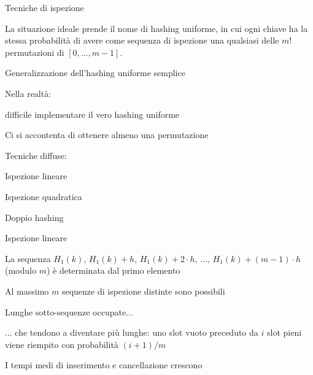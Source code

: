 \begin{frame}{Tecniche di ispezione}

\vspace{-9pt}
\begin{myboxtitle}
La situazione ideale prende il nome di \alert{hashing uniforme}, in cui
ogni chiave ha la stessa probabilità di avere come sequenza di ispezione
una qualsiasi delle $m!$ permutazioni di $[0, \ldots, m-1]$.
\end{myboxtitle}

\BIL
\item Generalizzazione dell'hashing uniforme semplice
\item Nella realtà:
\BI
\item \EE difficile implementare il vero hashing uniforme
\item Ci si accontenta di ottenere almeno una permutazione
\EI
\item Tecniche diffuse:
\BI
\item \alert{Ispezione lineare}
\item \alert{Ispezione quadratica}
\item \alert{Doppio hashing}
\EI
\EIL

\end{frame}

\begin{frame}{Ispezione lineare}
	
\vspace{-9pt}

\BIL
\item La sequenza $H_1(k)$, $H_1(k)+h$, $H_1(k)+2 \cdot h$, $\ldots$, $H_1(k)+(m-1) \cdot h$ 
(modulo $m$) è determinata dal primo elemento
\item Al massimo $m$ sequenze di ispezione distinte sono possibili
\EIL

\begin{myboxtitle}
\BI
\item Lunghe sotto-sequenze occupate...
\item ... che tendono a diventare più lunghe: uno slot vuoto preceduto da $i$ 
slot pieni viene riempito con probabilità $(i+1)/m$
\item I tempi medi di inserimento e cancellazione crescono	
\EI
\end{myboxtitle}
\end{frame}


